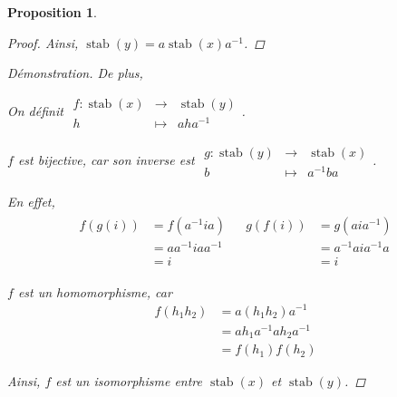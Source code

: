 \documentclass{report}
\newcommand*{\stab}{\operatorname{stab}}
\newtheorem*{prop}{Proposition}
\theoremstyle{definition}
\theoremstyle{remark}
\newenvironment*{subproof}[1][D\'emonstration]
{
\begin{proof}[#1]

}
{
	\renewcommand{\qedsymbol}{$\blacksquare$}
\end{proof}
\renewcommand{\qedsymbol}{$\square$}
}
\begin{document}
\begin{prop}
\begin{proof}
			Ainsi, $\stab(y) = a \stab(x) a^{-1}$.
		\end{proof}
		\begin{subproof}{De plus,}~

			On d\'efinit $\begin{array}{rcl}
				f:\stab(x)&\to&\stab(y)\\
				h&\mapsto&aha^{-1}
			\end{array}$.

			$f$ est bijective, car son inverse est $\begin{array}{rcl}
				g:\stab(y)&\to&\stab(x)\\
				b&\mapsto&a^{-1}ba
			\end{array}$.%

			En effet,
			\begin{align*}
				\begin{split}
					f(g(i))&= f(a^{-1}ia)\\
					&= aa^{-1}iaa^{-1}\\
					&= i
				\end{split}
				&
				\begin{split}
					g(f(i))&= g(aia^{-1})\\
					&= a^{-1}aia^{-1}a\\
					&= i
				\end{split}
			\end{align*}

			$f$ est un homomorphisme, car
			\begin{align*}
				f(h_1h_2)&= a(h_1h_2)a^{-1}\\
				&= ah_1a^{-1}ah_2a^{-1}\\
				&= f(h_1)f(h_2)
			\end{align*}

			Ainsi, $f$ est un isomorphisme entre $\stab(x)$ et $\stab(y)$.
		\end{subproof}
	\end{prop}
\end{document}
